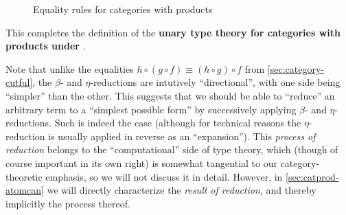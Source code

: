\documentclass{book}
\let\types\vdash
\def\pair#1#2{\langle #1,#2\rangle}
\begin{document}
\begin{figure}
  \centering
  \caption{Equality rules for categories with products}
  \label{fig:catprod-equality}
\end{figure}

This completes the definition of the \textbf{unary type theory for categories with products under \cG}.

\begin{rmk}\label{rmk:beta-reduction}
  Note that unlike the equalities $h\circ (g\circ f) \equiv (h\circ g)\circ f$ from \cref{sec:category-cutful}, the $\beta$- and $\eta$-reductions are intutively ``directional'', with one side being ``simpler'' than the other.
  This suggests that we should be able to ``reduce'' an arbitrary term to a ``simplest possible form'' by successively applying $\beta$- and $\eta$-reductions.
  Such is indeed the case (although for technical reasons the $\eta$-reduction is usually applied in reverse as an ``expansion'').
  This \emph{process of reduction} belongs to the ``computational'' side of type theory, which (though of course important in its own right) is somewhat tangential to our category-theoretic emphasis, so we will not discuss it in detail.
  However, in \cref{sec:catprod-atomcan} we will directly characterize the \emph{result of reduction}, and thereby implicitly the process thereof.
\end{rmk}
\end{document}
